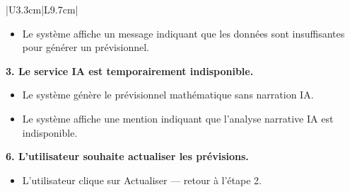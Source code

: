 \documentclass[a4paper,12pt]{report}
\begin{document}
\begin{longtable}{|U{3.3cm}|L{9.7cm}|}
\begin{itemize}
    \item[2.1] Le système affiche un message indiquant que les données sont insuffisantes pour générer un prévisionnel.
\end{itemize}
\textbf{3. Le service IA est temporairement indisponible.}
\begin{itemize}
    \item[3.1] Le système génère le prévisionnel mathématique sans narration IA.
    \item[3.2] Le système affiche une mention indiquant que l'analyse narrative IA est indisponible.
\end{itemize}
\textbf{6. L'utilisateur souhaite actualiser les prévisions.}
\begin{itemize}
    \item[6.1] L'utilisateur clique sur Actualiser --- retour à l'étape 2.
\end{itemize} 
\end{longtable}
\end{document}
